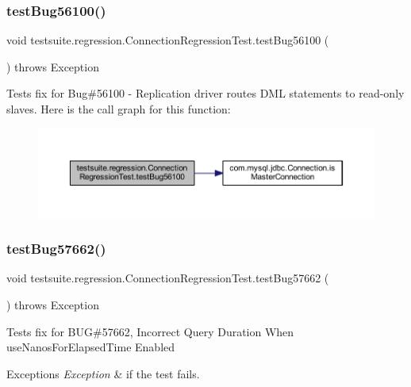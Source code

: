 \subsubsection{\texorpdfstring{test\+Bug56100()}{testBug56100()}}
{\footnotesize\ttfamily void testsuite.\+regression.\+Connection\+Regression\+Test.\+test\+Bug56100 (\begin{DoxyParamCaption}{ }\end{DoxyParamCaption}) throws Exception}

Tests fix for Bug\#56100 -\/ Replication driver routes D\+ML statements to read-\/only slaves. Here is the call graph for this function\+:
\nopagebreak
\begin{figure}[H]
\begin{center}
\leavevmode
\includegraphics[width=350pt]{classtestsuite_1_1regression_1_1_connection_regression_test_a5b74dbc899a9fefe265aabac1e1818ce_cgraph}
\end{center}
\end{figure}
\mbox{\label{classtestsuite_1_1regression_1_1_connection_regression_test_a17f3b11b2a832994194387aa1ebc110e}} 
\subsubsection{\texorpdfstring{test\+Bug57662()}{testBug57662()}}
{\footnotesize\ttfamily void testsuite.\+regression.\+Connection\+Regression\+Test.\+test\+Bug57662 (\begin{DoxyParamCaption}{ }\end{DoxyParamCaption}) throws Exception}

Tests fix for B\+UG\#57662, Incorrect Query Duration When use\+Nanos\+For\+Elapsed\+Time Enabled


\begin{DoxyExceptions}{Exceptions}
{\em Exception} & if the test fails. \\
\hline
\end{DoxyExceptions}
\mbox{\label{classtestsuite_1_1regression_1_1_connection_regression_test_ae350fa13fa69dbd3f3a7e5b23ee15503}} 
